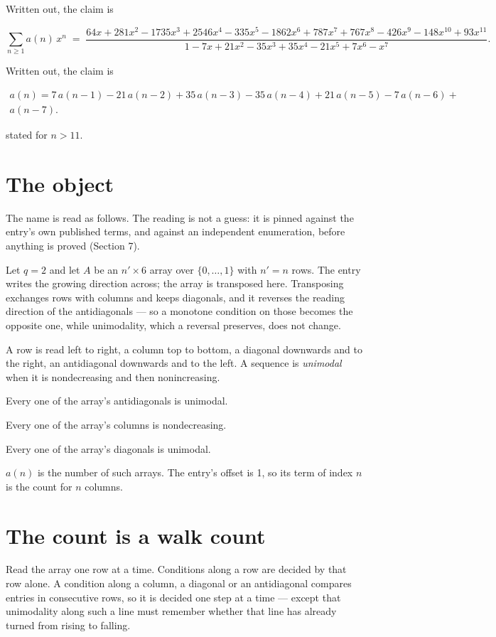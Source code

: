 \documentclass[11pt]{article}
\theoremstyle{definition}
\begin{document}
Written out, the claim is

\[\sum_{n \ge 1} a(n)\,x^n \;=\; \frac{64x + 281x^{2} - 1735x^{3} + 2546x^{4} - 335x^{5} - 1862x^{6} + 787x^{7} + 767x^{8} - 426x^{9} - 148x^{10} + 93x^{11}}{1 - 7x + 21x^{2} - 35x^{3} + 35x^{4} - 21x^{5} + 7x^{6} - x^{7}}.\]

Written out, the claim is

\begin{multline*} a(n) = 7\,a(n-1) - 21\,a(n-2) + 35\,a(n-3) - 35\,a(n-4) + 21\,a(n-5) - 7\,a(n-6) + \\ a(n-7). \end{multline*}

stated for $n > 11$.

\section{The object}

The name is read as follows. The reading is not a guess: it is pinned against the entry's own published terms, and against an independent enumeration, before anything is proved (Section 7).

Let $q = 2$ and let $A$ be an $n' \times 6$ array over $\{0,\dots,1\}$ with $n' = n$ rows. The entry writes the growing direction across; the array is transposed here. Transposing exchanges rows with columns and keeps diagonals, and it reverses the reading direction of the antidiagonals --- so a monotone condition on those becomes the opposite one, while unimodality, which a reversal preserves, does not change.

A row is read left to right, a column top to bottom, a diagonal downwards and to the right, an antidiagonal downwards and to the left. A sequence is {\itshape unimodal} when it is nondecreasing and then nonincreasing.

Every one of the array's antidiagonals is unimodal.

Every one of the array's columns is nondecreasing.

Every one of the array's diagonals is unimodal.

$a(n)$ is the number of such arrays. The entry's offset is 1, so its term of index $n$ is the count for $n$ columns.

\section{The count is a walk count}

Read the array one row at a time. Conditions along a row are decided by that row alone. A condition along a column, a diagonal or an antidiagonal compares entries in consecutive rows, so it is decided one step at a time --- except that unimodality along such a line must remember whether that line has already turned from rising to falling.
\end{document}
